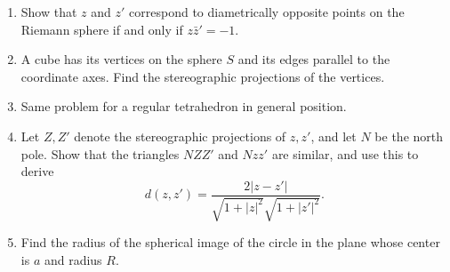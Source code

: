 \begin{enumerate}
\item
  Show that \(z\) and \(z'\) correspond to diametrically opposite points on the
  Riemann sphere if and only if \(z\bar{z}' = -1\).
\item
  A cube has its vertices on the sphere \(S\) and its edges parallel to the
  coordinate axes.
  Find the stereographic projections of the vertices.
\item
  Same problem for a regular tetrahedron in general position.
\item
  Let \(Z,Z'\) denote the stereographic projections of \(z,z'\), and let \(N\)
  be the north pole.
  Show that the triangles \(NZZ'\) and \(Nzz'\) are similar, and use this to
  derive
  \[
  d(z, z') = \frac{2\lvert z - z'\rvert}{\sqrt{1 + \lvert z\rvert^2}
    \sqrt{1 + \lvert z'\rvert^2}}.
  \]
\item
  Find the radius of the spherical image of the circle in the plane whose
  center is \(a\) and radius \(R\).
\end{enumerate}


